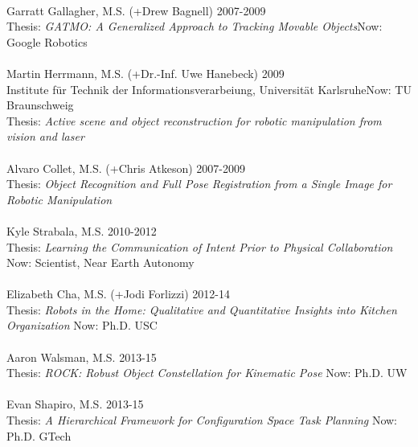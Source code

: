 \\
Garratt Gallagher, M.S. (+Drew Bagnell) \hfill 2007-2009\\ 
Thesis: \textit{GATMO: A Generalized Approach to Tracking Movable Objects}\hfill Now: Google Robotics\\
\\
Martin Herrmann, M.S. (+Dr.-Inf. Uwe Hanebeck) \hfill 2009\\
Institute f\"ur Technik der Informationsverarbeiung, Universit\"at Karlsruhe\hfill Now: TU Braunschweig\\
Thesis: \textit{Active scene and object reconstruction for robotic manipulation from vision and laser}\\
\\
Alvaro Collet, M.S. (+Chris Atkeson) \hfill 2007-2009\\
Thesis: \textit{Object Recognition and Full Pose Registration from a Single Image for Robotic Manipulation}\\
\\
Kyle Strabala, M.S. \hfill 2010-2012\\
Thesis: \textit{Learning the Communication of Intent Prior to Physical Collaboration} \hfill Now: Scientist, Near Earth Autonomy\\
\\
Elizabeth Cha, M.S. (+Jodi Forlizzi)  \hfill 2012-14\\
Thesis: \textit{Robots in the Home: Qualitative and Quantitative Insights into Kitchen Organization} \hfill Now: Ph.D. USC\\
\\
Aaron Walsman, M.S.  \hfill 2013-15\\
Thesis: \textit{ROCK: Robust Object Constellation for Kinematic Pose} \hfill Now: Ph.D. UW\\
\\
Evan Shapiro, M.S.  \hfill 2013-15\\
Thesis: \textit{A Hierarchical Framework for Configuration Space Task Planning} \hfill Now: Ph.D. GTech\\

